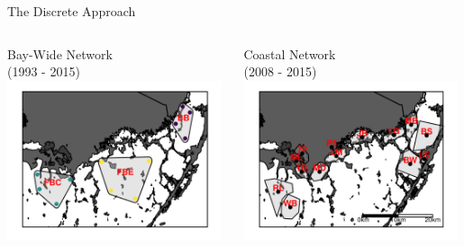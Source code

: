 \documentclass[compress,noflama,nosectionpages]{beamer}
\begin{document}
\begin{frame}{The Discrete Approach}
	\begin{columns}
		\begin{column}[c]{5.5cm}
			\begin{center}
			Bay-Wide Network\\ (1993 - 2015)
			\includegraphics[height=4.7cm,clip=true,trim = 0mm 0mm 0mm 0mm,keepaspectratio=true]{figures/fbmap_wqmn.png}%
			\end{center}
		\end{column}
	
		\begin{column}[c]{6cm}
			\begin{center}
			Coastal Network\\ (2008 - 2015)
			\includegraphics[height=4.7cm,clip=true,trim = 0mm 0mm 0mm 0mm,keepaspectratio=true]{figures/fbmap_dflow.png}%
			\end{center}
		\end{column}
	\end{columns}
\end{frame}
\end{document}

